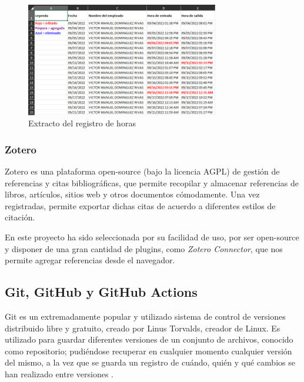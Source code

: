             \begin{figure}[h!]
                \centering
                \includegraphics[width=0.75\textwidth]{figures/Teams excel.PNG}
                \caption{Extracto del registro de horas}
                \label{fig:teams:excel}
            \end{figure}
        

        \subsubsection{Zotero}
            Zotero es una plataforma open-source (bajo la licencia AGPL) de gestión de referencias y citas 
            bibliográficas, que permite recopilar y almacenar referencias de libros, artículos, sitios web y otros 
            documentos cómodamente. Una vez registradas, permite exportar dichas citas de acuerdo a diferentes estilos 
            de citación.
                
            En este proyecto ha sido seleccionada por su facilidad de uso, por ser open-source y disponer de una gran 
            cantidad de plugins, como \textit{Zotero Connector}, que nos permite agregar referencias desde el navegador.
        
        \subsection{Git, GitHub y GitHub Actions}
            Git es un extremadamente popular y utilizado sistema de control de versiones distribuido libre y gratuito,
            creado por Linus Torvalds, creador de Linux. Es utilizado para guardar diferentes versiones
            de un conjunto de archivos, conocido como repositorio; pudiéndose recuperar en cualquier momento
            cualquier versión del mismo, a la vez que se guarda un registro de cuándo, quién y qué cambios se han 
            realizado entre versiones \cite{atlassian_software_nodate}.

